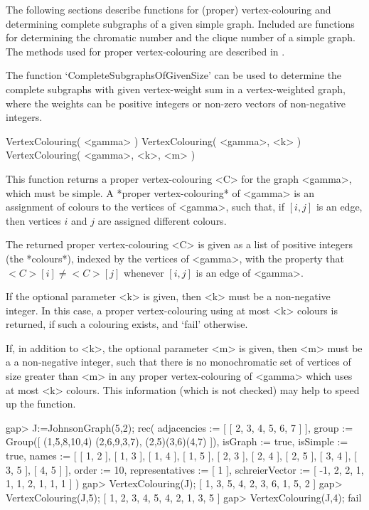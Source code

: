 %
%
%
%
\def\GRAPE{\sf GRAPE}
\def\nauty{\it nauty}
\def\G{\Gamma}
\def\Aut{{\rm Aut}\,}
\def\x{\times}

The following sections describe functions for (proper) vertex-colouring
and determining complete subgraphs of a given simple graph. Included are
functions for determining the chromatic number and the clique number of
a simple graph. The methods used for proper vertex-colouring are described
in \cite{Soi24a}.

The function `CompleteSubgraphsOfGivenSize' can be used to determine
the complete subgraphs with given vertex-weight sum in a vertex-weighted
graph,
where the weights can be positive
integers or non-zero vectors of non-negative integers.


\>VertexColouring( <gamma> )
\>VertexColouring( <gamma>, <k> )
\>VertexColouring( <gamma>, <k>, <m> )

This function returns a proper vertex-colouring <C> for the graph
<gamma>, which must be simple. A *proper vertex-colouring*
of <gamma> is an assignment of colours to the vertices
of <gamma>, such that, if $[i,j]$ is an edge, then vertices $i$ and $j$
are assigned different colours.

The returned proper vertex-colouring <C> is given as a list of positive
integers (the *colours*), indexed by the vertices of <gamma>, with the
property that $<C>[i]\not=<C>[j]$ whenever $[i,j]$ is an edge of <gamma>.

If the optional parameter <k> is given, then <k> must be a non-negative
integer. In this case, a proper vertex-colouring using at most <k>
colours is returned, if such a colouring exists, and `fail' otherwise.

If, in addition to <k>, the optional parameter <m> is given, then <m>
must be a a non-negative integer, such that there is no monochromatic
set of vertices of size greater than <m> in any proper vertex-colouring
of <gamma> which uses at most <k> colours.  This information (which is
not checked) may help to speed up the function.

\beginexample
gap> J:=JohnsonGraph(5,2);
rec( adjacencies := [ [ 2, 3, 4, 5, 6, 7 ] ], group := Group([ (1,5,8,10,4)
  (2,6,9,3,7), (2,5)(3,6)(4,7) ]), isGraph := true, isSimple := true, 
  names := [ [ 1, 2 ], [ 1, 3 ], [ 1, 4 ], [ 1, 5 ], [ 2, 3 ], [ 2, 4 ], 
      [ 2, 5 ], [ 3, 4 ], [ 3, 5 ], [ 4, 5 ] ], order := 10, 
  representatives := [ 1 ], schreierVector := [ -1, 2, 2, 1, 1, 1, 2, 1, 1, 1 
     ] )
gap> VertexColouring(J);
[ 1, 3, 5, 4, 2, 3, 6, 1, 5, 2 ]
gap> VertexColouring(J,5);
[ 1, 2, 3, 4, 5, 4, 2, 1, 3, 5 ]
gap> VertexColouring(J,4);
fail
\endexample

